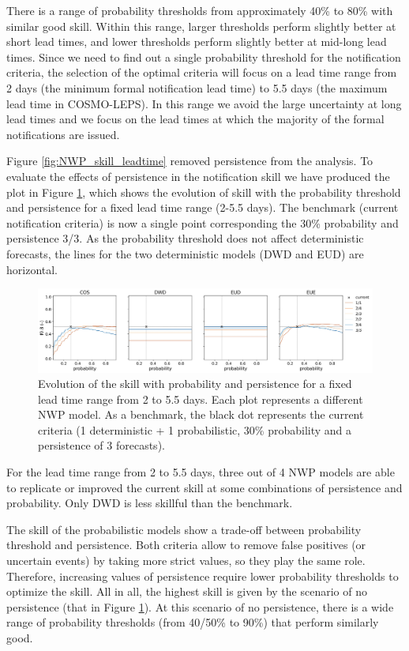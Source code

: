 \documentclass[preprint,12pt]{elsarticle}
\begin{document}
There is a range of probability thresholds from approximately 40\% to 80\% with similar good skill. Within this range, larger thresholds perform slightly better at short lead times, and lower thresholds perform slightly better at mid-long lead times. Since we need to find out a single probability threshold for the notification criteria, the selection of the optimal criteria will focus on a lead time range from 2 days (the minimum formal notification lead time) to 5.5 days (the maximum lead time in COSMO-LEPS). In this range we avoid the large uncertainty at long lead times and we focus on the lead times at which the majority of the formal notifications are issued.

Figure \ref{fig:NWP_skill_leadtime} removed persistence from the analysis. To evaluate the effects of persistence in the notification skill we have produced the plot in Figure \ref{fig:NWP_skill_probability}, which shows the evolution of skill with the probability threshold and persistence for a fixed lead time range (2-5.5 days). The benchmark (current notification criteria) is now a single point corresponding the 30\% probability and persistence 3/3. As the probability threshold does not affect deterministic forecasts, the lines for the two deterministic models (DWD and EUD) are horizontal.

\begin{figure}
    \centering
    \includegraphics[width=1\textwidth]{figures/skill_persistence_probability_060h_NWP.jpg}
    \caption{Evolution of the skill with probability and persistence for a fixed lead time range from 2 to 5.5 days. Each plot represents a different NWP model. As a benchmark, the black dot represents the current criteria (1 deterministic + 1 probabilistic, 30\% probability and a persistence of 3 forecasts).}
    \label{fig:NWP_skill_probability}
\end{figure}

For the lead time range from 2 to 5.5 days, three out of 4 NWP models are able to replicate or improved the current skill at some combinations of persistence and probability. Only DWD is less skillful than the benchmark.

The skill of the probabilistic models show a trade-off between probability threshold and persistence. Both criteria allow to remove false positives (or uncertain events) by taking more strict values, so they play the same role. Therefore, increasing values of persistence require lower probability thresholds to optimize the skill. All in all, the highest skill is given by the scenario of no persistence (that in Figure \ref{fig:NWP_skill_probability}). At this scenario of no persistence, there is a wide range of probability thresholds (from 40/50\% to 90\%) that perform similarly good.
\end{document}
